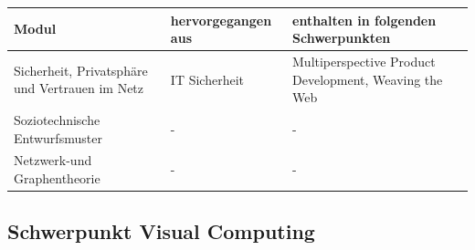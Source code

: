 \begin{longtable}[c]{@{}lll@{}}
\toprule
\begin{minipage}[b]{0.33\columnwidth}\raggedright\strut
Modul
\strut\end{minipage} &
\begin{minipage}[b]{0.33\columnwidth}\raggedright\strut
hervorgegangen aus
\strut\end{minipage} &
\begin{minipage}[b]{0.33\columnwidth}\raggedright\strut
enthalten in folgenden Schwerpunkten
\strut\end{minipage}\tabularnewline
\midrule
\endhead
\begin{minipage}[t]{0.33\columnwidth}\raggedright\strut
Sicherheit, Privatsphäre und Vertrauen im Netz
\strut\end{minipage} &
\begin{minipage}[t]{0.33\columnwidth}\raggedright\strut
IT Sicherheit
\strut\end{minipage} &
\begin{minipage}[t]{0.33\columnwidth}\raggedright\strut
Multiperspective Product Development, Weaving the Web
\strut\end{minipage}\tabularnewline
\begin{minipage}[t]{0.33\columnwidth}\raggedright\strut
Soziotechnische Entwurfsmuster
\strut\end{minipage} &
\begin{minipage}[t]{0.33\columnwidth}\raggedright\strut
-
\strut\end{minipage} &
\begin{minipage}[t]{0.33\columnwidth}\raggedright\strut
-
\strut\end{minipage}\tabularnewline
\begin{minipage}[t]{0.33\columnwidth}\raggedright\strut
Netzwerk-und Graphentheorie
\strut\end{minipage} &
\begin{minipage}[t]{0.33\columnwidth}\raggedright\strut
-
\strut\end{minipage} &
\begin{minipage}[t]{0.33\columnwidth}\raggedright\strut
-
\strut\end{minipage}\tabularnewline
\bottomrule
\end{longtable}

\subsection{Schwerpunkt Visual
Computing}\label{schwerpunkt-visual-computing}

